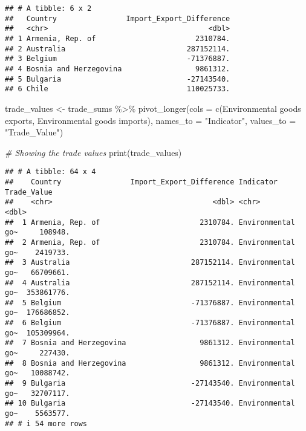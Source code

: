 \documentclass[
]{article}
\newenvironment{Shaded}{\begin{snugshade}}{\end{snugshade}}
\newcommand{\AttributeTok}[1]{\textcolor[rgb]{0.77,0.63,0.00}{#1}}
\newcommand{\CommentTok}[1]{\textcolor[rgb]{0.56,0.35,0.01}{\textit{#1}}}
\newcommand{\FunctionTok}[1]{\textcolor[rgb]{0.00,0.00,0.00}{#1}}
\newcommand{\NormalTok}[1]{#1}
\newcommand{\OtherTok}[1]{\textcolor[rgb]{0.56,0.35,0.01}{#1}}
\newcommand{\SpecialCharTok}[1]{\textcolor[rgb]{0.00,0.00,0.00}{#1}}
\newcommand{\StringTok}[1]{\textcolor[rgb]{0.31,0.60,0.02}{#1}}
\begin{document}
\begin{verbatim}
## # A tibble: 6 x 2
##   Country                Import_Export_Difference
##   <chr>                                     <dbl>
## 1 Armenia, Rep. of                       2310784.
## 2 Australia                            287152114.
## 3 Belgium                              -71376887.
## 4 Bosnia and Herzegovina                 9861312.
## 5 Bulgaria                             -27143540.
## 6 Chile                                110025733.
\end{verbatim}

\begin{Shaded}
\begin{Highlighting}[]
\NormalTok{trade\_values }\OtherTok{\textless{}{-}}\NormalTok{ trade\_sums }\SpecialCharTok{\%\textgreater{}\%}
  \FunctionTok{pivot\_longer}\NormalTok{(}\AttributeTok{cols =} \FunctionTok{c}\NormalTok{(}\StringTok{\textasciigrave{}}\AttributeTok{Environmental goods exports}\StringTok{\textasciigrave{}}\NormalTok{, }\StringTok{\textasciigrave{}}\AttributeTok{Environmental goods imports}\StringTok{\textasciigrave{}}\NormalTok{),}
               \AttributeTok{names\_to =} \StringTok{"Indicator"}\NormalTok{,}
               \AttributeTok{values\_to =} \StringTok{"Trade\_Value"}\NormalTok{)}

\CommentTok{\# Showing the trade values}
\FunctionTok{print}\NormalTok{(trade\_values)}
\end{Highlighting}
\end{Shaded}

\begin{verbatim}
## # A tibble: 64 x 4
##    Country                Import_Export_Difference Indicator         Trade_Value
##    <chr>                                     <dbl> <chr>                   <dbl>
##  1 Armenia, Rep. of                       2310784. Environmental go~     108948.
##  2 Armenia, Rep. of                       2310784. Environmental go~    2419733.
##  3 Australia                            287152114. Environmental go~   66709661.
##  4 Australia                            287152114. Environmental go~  353861776.
##  5 Belgium                              -71376887. Environmental go~  176686852.
##  6 Belgium                              -71376887. Environmental go~  105309964.
##  7 Bosnia and Herzegovina                 9861312. Environmental go~     227430.
##  8 Bosnia and Herzegovina                 9861312. Environmental go~   10088742.
##  9 Bulgaria                             -27143540. Environmental go~   32707117.
## 10 Bulgaria                             -27143540. Environmental go~    5563577.
## # i 54 more rows
\end{verbatim}
\end{document}
